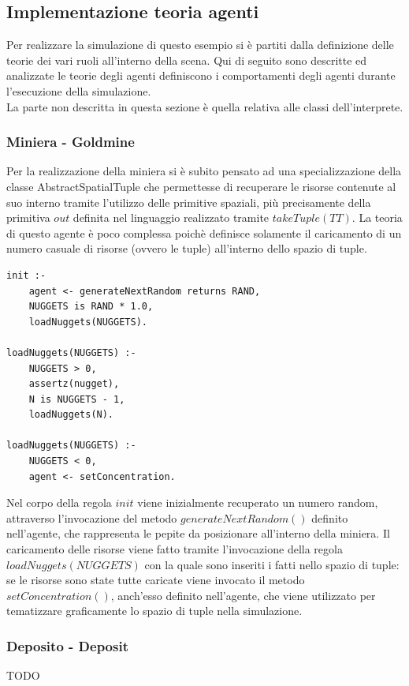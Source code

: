 \subsection{Implementazione teoria agenti}
Per realizzare la simulazione di questo esempio si è partiti dalla definizione delle teorie dei vari ruoli all'interno della scena. Qui di seguito sono descritte ed analizzate le teorie degli agenti definiscono i comportamenti degli agenti durante l'esecuzione della simulazione.
\\
La parte non descritta in questa sezione è quella relativa alle classi dell'interprete.


\subsubsection{Miniera - Goldmine}
Per la realizzazione della miniera si è subito pensato ad una specializzazione della classe AbstractSpatialTuple che permettesse di recuperare le risorse contenute al suo interno tramite l'utilizzo delle primitive spaziali, più precisamente della primitiva $out$ definita nel linguaggio realizzato tramite $takeTuple(TT)$. La teoria di questo agente è poco complessa poichè definisce solamente il caricamento di un numero casuale di risorse (ovvero le tuple) all'interno dello spazio di tuple.

\medskip
\begin{lstlisting}[firstnumber=1,label={lst:Goldmine},caption={Teoria miniera}]
init :-
    agent <- generateNextRandom returns RAND,
    NUGGETS is RAND * 1.0,
    loadNuggets(NUGGETS).

loadNuggets(NUGGETS) :-
    NUGGETS > 0,
    assertz(nugget),
    N is NUGGETS - 1,
    loadNuggets(N).

loadNuggets(NUGGETS) :-
    NUGGETS < 0,
    agent <- setConcentration.
\end{lstlisting}
Nel corpo della regola $init$ viene inizialmente recuperato un numero random, attraverso l'invocazione del metodo $generateNextRandom()$ definito nell'agente, che rappresenta le pepite da posizionare all'interno della miniera. Il caricamento delle risorse viene fatto tramite l'invocazione della regola $loadNuggets(NUGGETS)$ con la quale sono inseriti i fatti nello spazio di tuple: se le risorse sono state tutte caricate viene invocato il metodo $setConcentration()$, anch'esso definito nell'agente, che viene utilizzato per tematizzare graficamente lo spazio di tuple nella simulazione.

\subsubsection{Deposito - Deposit}
TODO


